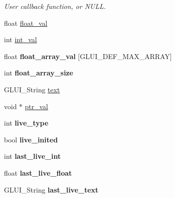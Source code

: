 \begin{DoxyCompactItemize}
\begin{DoxyCompactList}\small\item\em User callback function, or N\+U\+L\+L. \end{DoxyCompactList}\item 
float \hyperlink{class_g_l_u_i___control_ac69b8e62a6f4f16c83b70a64f73d7a1c}{float\+\_\+val}
\item 
int \hyperlink{class_g_l_u_i___control_a4a890b5b5a854b34200b5e63f1069b4e}{int\+\_\+val}
\item 
\hypertarget{class_g_l_u_i___control_a6d2cc0faaa678706939ac775c523871a}{float {\bfseries float\+\_\+array\+\_\+val} \mbox{[}G\+L\+U\+I\+\_\+\+D\+E\+F\+\_\+\+M\+A\+X\+\_\+\+A\+R\+R\+A\+Y\mbox{]}}\label{class_g_l_u_i___control_a6d2cc0faaa678706939ac775c523871a}

\item 
\hypertarget{class_g_l_u_i___control_a504f6aff85729e665fa8664d170d9878}{int {\bfseries float\+\_\+array\+\_\+size}}\label{class_g_l_u_i___control_a504f6aff85729e665fa8664d170d9878}

\item 
G\+L\+U\+I\+\_\+\+String \hyperlink{class_g_l_u_i___control_af0d60e9736f4dbc34e9a536e75876d72}{text}
\item 
void $\ast$ \hyperlink{class_g_l_u_i___control_a0890ea809b8d980695939e1d92a0af47}{ptr\+\_\+val}
\item 
\hypertarget{class_g_l_u_i___control_a8ba7cae809a47dd870592aa2cc85483b}{int {\bfseries live\+\_\+type}}\label{class_g_l_u_i___control_a8ba7cae809a47dd870592aa2cc85483b}

\item 
\hypertarget{class_g_l_u_i___control_a74977797cf84a38ef78de8c548bc2d25}{bool {\bfseries live\+\_\+inited}}\label{class_g_l_u_i___control_a74977797cf84a38ef78de8c548bc2d25}

\item 
\hypertarget{class_g_l_u_i___control_abef31d8d51c8088afd6ac96ec7b596bf}{int {\bfseries last\+\_\+live\+\_\+int}}\label{class_g_l_u_i___control_abef31d8d51c8088afd6ac96ec7b596bf}

\item 
\hypertarget{class_g_l_u_i___control_aa9ebadbed670a1fa061918705083db57}{float {\bfseries last\+\_\+live\+\_\+float}}\label{class_g_l_u_i___control_aa9ebadbed670a1fa061918705083db57}

\item 
\hypertarget{class_g_l_u_i___control_ac77569805eb6ccfce3f4ff1d09c309b6}{G\+L\+U\+I\+\_\+\+String {\bfseries last\+\_\+live\+\_\+text}}\label{class_g_l_u_i___control_ac77569805eb6ccfce3f4ff1d09c309b6}


\end{DoxyCompactItemize}
